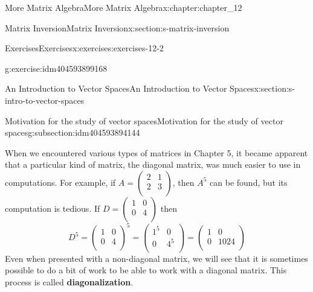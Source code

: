 \documentclass[twoside,10pt,]{book}
\newcommand{\terminology}[1]{\textbf{#1}}
\numberwithin{equation}{section}
\renewcommand{\vec}[1]{\mathbf{#1}}
\begin{document}
\begin{chapterptx}{More Matrix Algebra}{}{More Matrix Algebra}{}{}{x:chapter:chapter_12}
\begin{sectionptx}{Matrix Inversion}{}{Matrix Inversion}{}{}{x:section:s-matrix-inversion}
\begin{exercises-subsection}{Exercises}{}{Exercises}{}{}{x:exercises:exercises-12-2}
\begin{divisionexercise}{5}{}{}{g:exercise:idm404593899168}
\end{divisionexercise}%
\end{exercises-subsection}
\end{sectionptx}
%
%
\typeout{************************************************}
\typeout{************************************************}
%
\begin{sectionptx}{An Introduction to Vector Spaces}{}{An Introduction to Vector Spaces}{}{}{x:section:s-intro-to-vector-spaces}
%
%
%
\typeout{************************************************}
\typeout{************************************************}
%
\begin{subsectionptx}{Motivation for the study of vector spaces}{}{Motivation for the study of vector spaces}{}{}{g:subsection:idm404593894144}
\(\renewcommand{\vec}[1]{\mathbf{#1}}\)%
\par
When we encountered various types of matrices in Chapter 5, it became apparent that a particular kind of matrix, the diagonal matrix, was much easier to use in computations. For example, if \(A =\left(
\begin{array}{cc}
2 & 1 \\
2 & 3 \\
\end{array}
\right)\), then \(A^5\) can be found, but its computation is tedious.  If \(D =\left(
\begin{array}{cc}
1 & 0 \\
0 & 4 \\
\end{array}
\right)\) then%
\begin{equation*}
D^5 =\left(
\begin{array}{cc}
1 & 0 \\
0 & 4 \\
\end{array}
\right)^5= \left(
\begin{array}{cc}
1^5 & 0 \\
0 & 4^5 \\
\end{array}
\right)= \left(
\begin{array}{cc}
1 & 0 \\
0 & 1024 \\
\end{array}
\right)
\end{equation*}
Even when presented with a non-diagonal matrix, we will see that it is sometimes possible to do a bit of work to be able to work with a diagonal matrix.  This process is called \terminology{diagonalization}.%

\end{subsectionptx}
\end{sectionptx}
\end{chapterptx}
\end{document}
